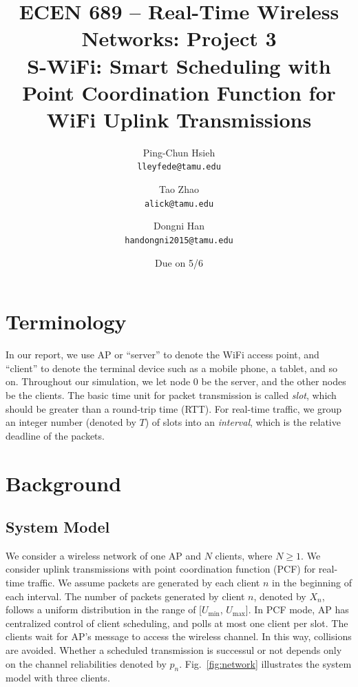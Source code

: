 \documentclass{article}
\begin{document}
\title{\bfseries ECEN 689 -- Real-Time Wireless Networks: Project 3\\
S-WiFi: Smart Scheduling with Point Coordination Function for WiFi Uplink Transmissions}
\date{Due on 5/6}
\author{%
Ping-Chun Hsieh\\
\texttt{lleyfede@tamu.edu}
\and
Tao Zhao\\
\texttt{alick@tamu.edu}
\and
Dongni Han\\
\texttt{handongni2015@tamu.edu}
}
\maketitle

\section*{Terminology}

In our report, we use AP or ``server'' to denote the WiFi access point, and ``client'' to denote the terminal device such as a mobile phone, a tablet, and so on. Throughout our simulation, we let node $0$ be the server, and the other nodes be the clients. The basic time unit for packet transmission is called \emph{slot}, which should be greater than a round-trip time (RTT). For real-time traffic, we group an integer number (denoted by $T$) of slots into an \emph{interval}, which is the relative deadline of the packets.

\section{Background}
\subsection{System Model}
We consider a wireless network of one AP and $N$ clients, where $N\ge1$. We consider uplink transmissions with point coordination function (PCF) for real-time traffic. We assume packets are generated by each client $n$ in the beginning of each interval. The number of packets generated by client $n$, denoted by $X_n$, follows a uniform distribution in the range of [$U_\text{min}$, $U_\text{max}$]. In PCF mode, AP has centralized control of client scheduling, and polls at most one client per slot. The clients wait for AP's message to access the wireless channel. In this way, collisions are avoided. Whether a scheduled transmission is successul or not depends only on the channel reliabilities denoted by $p_n$. Fig.~\ref{fig:network} illustrates the system model with three clients.
\end{document}
